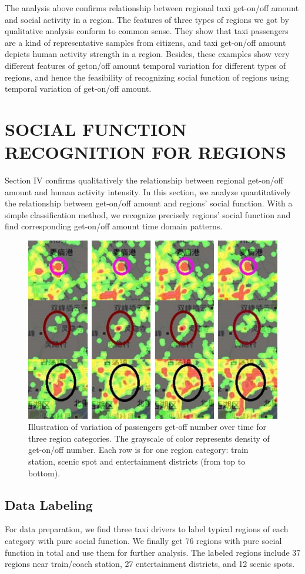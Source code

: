 \documentclass[a4paper, 10pt, conference]{ieeeconf}      %
\begin{document}
The analysis above confirms relationship between regional taxi get-on/off amount and social activity in a region. The features of three types of regions we got by qualitative analysis conform to common sense. They show that taxi passengers are a kind of representative samples from citizens, and taxi get-on/off amount depicts human activity strength in a region. Besides, these examples show very different features of geton/off amount temporal variation for different types of regions, and hence the feasibility of recognizing social function of regions using temporal variation of get-on/off amount.
\section{SOCIAL FUNCTION RECOGNITION FOR REGIONS}%
Section IV confirms qualitatively the relationship between regional get-on/off amount and human activity intensity. In this section, we analyze quantitatively the relationship between get-on/off amount and regions’ social function. With a simple classification method, we recognize precisely regions’ social function and find corresponding get-on/off amount time domain patterns.
\begin{figure}[htpb]
    \centering
    \includegraphics{fig/f2.png}
    \caption{Illustration of variation of passengers get-off number over time for three region categories. The grayscale of color represents density of get-on/off number. Each row is for one region category: train station, scenic spot and entertainment districts (from top to bottom).}
    \label{fig:my_label_2}
\end{figure}
\subsection{Data Labeling} For data preparation, we find three taxi drivers to label typical regions of each category with pure social function. We finally get 76 regions with pure social function in total and use them for further analysis. The labeled regions include 37 regions near train/coach station, 27 entertainment districts, and 12 scenic spots.
\end{document}
